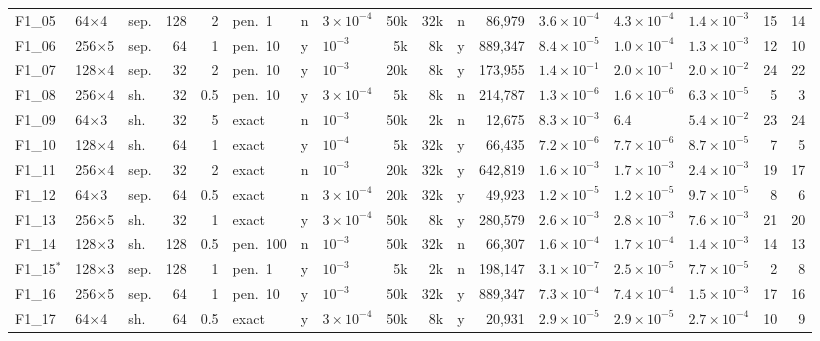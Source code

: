 \begin{table}[!htb]
\begin{tabular}{@{}lllrrlclrrcrlllrr@{}}
F1\_05 & 64$\times$4 & sep. & 128 & 2 & pen.\ 1 & n & $3{\times}10^{-4}$ & 50k & 32k & n & 86{,}979 & $3.6{\times}10^{-4}$ & $4.3{\times}10^{-4}$ & $1.4{\times}10^{-3}$ & 15 & 14 \\
F1\_06 & 256$\times$5 & sep. & 64 & 1 & pen.\ 10 & y & $10^{-3}$ & 5k & 8k & y & 889{,}347 & $8.4{\times}10^{-5}$ & $1.0{\times}10^{-4}$ & $1.3{\times}10^{-3}$ & 12 & 10 \\
F1\_07 & 128$\times$4 & sep. & 32 & 2 & pen.\ 10 & y & $10^{-3}$ & 20k & 8k & y & 173{,}955 & $1.4{\times}10^{-1}$ & $2.0{\times}10^{-1}$ & $2.0{\times}10^{-2}$ & 24 & 22 \\
F1\_08 & 256$\times$4 & sh. & 32 & 0.5 & pen.\ 10 & y & $3{\times}10^{-4}$ & 5k & 8k & n & 214{,}787 & $1.3{\times}10^{-6}$ & $1.6{\times}10^{-6}$ & $6.3{\times}10^{-5}$ & 5 & 3 \\
F1\_09 & 64$\times$3 & sh. & 32 & 5 & exact & n & $10^{-3}$ & 50k & 2k & n & 12{,}675 & $8.3{\times}10^{-3}$ & $6.4$ & $5.4{\times}10^{-2}$ & 23 & 24 \\
F1\_10 & 128$\times$4 & sh. & 64 & 1 & exact & y & $10^{-4}$ & 5k & 32k & y & 66{,}435 & $7.2{\times}10^{-6}$ & $7.7{\times}10^{-6}$ & $8.7{\times}10^{-5}$ & 7 & 5 \\
F1\_11 & 256$\times$4 & sep. & 32 & 2 & exact & n & $10^{-3}$ & 20k & 32k & y & 642{,}819 & $1.6{\times}10^{-3}$ & $1.7{\times}10^{-3}$ & $2.4{\times}10^{-3}$ & 19 & 17 \\
F1\_12 & 64$\times$3 & sep. & 64 & 0.5 & exact & n & $3{\times}10^{-4}$ & 20k & 32k & y & 49{,}923 & $1.2{\times}10^{-5}$ & $1.2{\times}10^{-5}$ & $9.7{\times}10^{-5}$ & 8 & 6 \\
F1\_13 & 256$\times$5 & sh. & 32 & 1 & exact & y & $3{\times}10^{-4}$ & 50k & 8k & y & 280{,}579 & $2.6{\times}10^{-3}$ & $2.8{\times}10^{-3}$ & $7.6{\times}10^{-3}$ & 21 & 20 \\
F1\_14 & 128$\times$3 & sh. & 128 & 0.5 & pen.\ 100 & n & $10^{-3}$ & 50k & 32k & n & 66{,}307 & $1.6{\times}10^{-4}$ & $1.7{\times}10^{-4}$ & $1.4{\times}10^{-3}$ & 14 & 13 \\
F1\_15$^{\ast}$ & 128$\times$3 & sep. & 128 & 1 & pen.\ 1 & y & $10^{-3}$ & 5k & 2k & n & 198{,}147 & $3.1{\times}10^{-7}$ & $2.5{\times}10^{-5}$ & $7.7{\times}10^{-5}$ & 2 & 8 \\
F1\_16 & 256$\times$5 & sep. & 64 & 1 & pen.\ 10 & y & $10^{-3}$ & 50k & 32k & y & 889{,}347 & $7.3{\times}10^{-4}$ & $7.4{\times}10^{-4}$ & $1.5{\times}10^{-3}$ & 17 & 16 \\
F1\_17 & 64$\times$4 & sh. & 64 & 0.5 & exact & y & $3{\times}10^{-4}$ & 50k & 8k & y & 20{,}931 & $2.9{\times}10^{-5}$ & $2.9{\times}10^{-5}$ & $2.7{\times}10^{-4}$ & 10 & 9 \\

\end{tabular}
\end{table}
